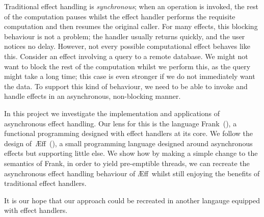 \documentclass[msc,deptreport,cs]{infthesis} %
\newcommand\aeff{{\AE}ff\xspace}
\newcommand{\todo}[1]
           {{\par\noindent\small\color{RoyalPurple}
  \framebox{\parbox{\dimexpr\linewidth-2\fboxsep-2\fboxrule}
    {\textbf{TODO:} #1}}}}
\begin{document}
Traditional effect handling is \emph{synchronous}; when an operation is invoked,
the rest of the computation pauses whilst the effect handler performs the
requisite computation and then resumes the original caller.
%
For many effects, this blocking behaviour is not a problem; the handler usually
returns quickly, and the user notices no delay. However, not every possible
computational effect behaves like this. Consider an effect involving a query to
a remote database. We might not want to block the rest of the computation whilst
we perform this, as the query might take a long time; this case is even stronger
if we do not immediately want the data. To support this kind of behaviour, we
need to be able to invoke and handle effects in an asynchronous, non-blocking
manner.

In this project we investigate the implementation and applications of
asynchronous effect handling. Our lens for this is the language
Frank~(\cite{convent2020doo}), a functional programming designed with effect
handlers at its core. We follow the design
of~\aeff~(\cite{ahman2020asynchronous}), a small programming language designed
around asynchronous effects but supporting little else.
%
We show how by making a simple change to the semantics of Frank, in order to
yield pre-emptible threads, we can recreate the asynchronous effect handling
behaviour of \aeff~whilst still enjoying the benefits of traditional effect
handlers.

\todo{Last paragraph could be fixed}

It is our hope that our approach could be recreated in another langauge equipped
with effect handlers.

\end{document}
